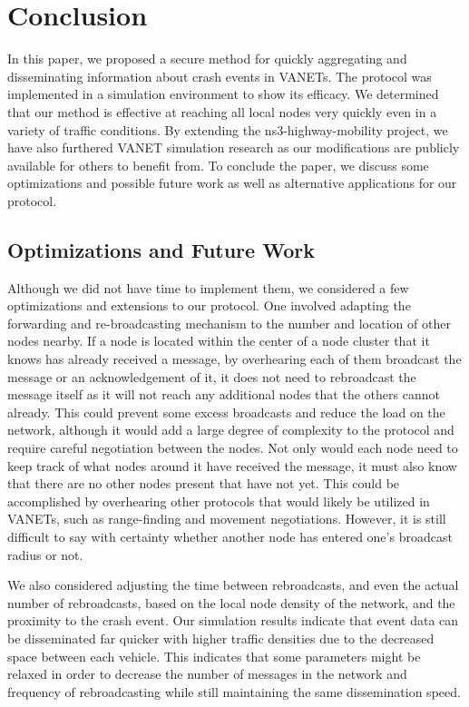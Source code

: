 \documentclass{IEEEtran}
\begin{document}
\section{Conclusion}

In this paper, we proposed a secure method for quickly aggregating and disseminating information about crash events in VANETs.
The protocol was implemented in a simulation environment to show its efficacy.
We determined that our method is effective at reaching all local nodes very quickly even in a variety of traffic conditions.
By extending the ns3-highway-mobility project, we have also furthered VANET simulation research as our modifications are publicly available for others to benefit from.
To conclude the paper, we discuss some optimizations and possible future work as well as alternative applications for our protocol.

\subsection{Optimizations and Future Work}

Although we did not have time to implement them, we considered a few optimizations and extensions to our protocol.
One involved adapting the forwarding and re-broadcasting mechanism to the number and location of other nodes nearby.
If a node is located within the center of a node cluster that it knows has already received a message, by overhearing each of them broadcast the message or an acknowledgement of it, it does not need to rebroadcast the message itself as it will not reach any additional nodes that the others cannot already.
This could prevent some excess broadcasts and reduce the load on the network, although it would add a large degree of complexity to the protocol and require careful negotiation between the nodes.
Not only would each node need to keep track of what nodes around it have received the message, it must also know that there are no other nodes present that have not yet.
This could be accomplished by overhearing other protocols that would likely be utilized in VANETs, such as range-finding and movement negotiations.
However, it is still difficult to say with certainty whether another node has entered one's broadcast radius or not.

We also considered adjusting the time between rebroadcasts, and even the actual number of rebroadcasts, based on the local node density of the network, and the proximity to the crash event.
Our simulation results indicate that event data can be disseminated far quicker with higher traffic densities due to the decreased space between each vehicle.
This indicates that some parameters might be relaxed in order to decrease the number of messages in the network and frequency of rebroadcasting while still maintaining the same dissemination speed.
\end{document}
